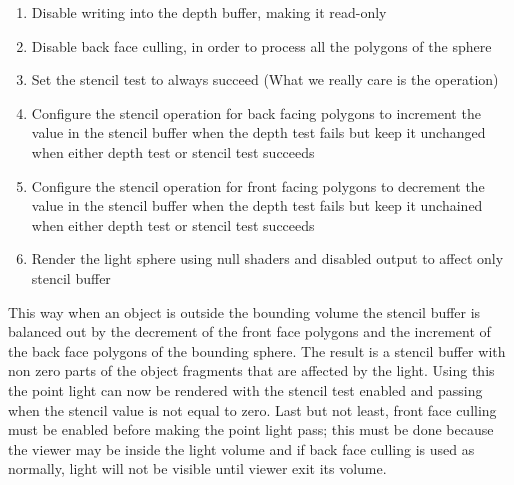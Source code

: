 \begin{enumerate}
    \item Disable writing into the depth buffer, making it read-only
    \item Disable back face culling, in order to process all the polygons of the sphere
    \item Set the stencil test to always succeed (What we really care is the operation)
    \item Configure the stencil operation for back facing polygons to increment the value in the stencil buffer
        when the depth test fails but keep it unchanged when either depth test or stencil test succeeds
    \item Configure the stencil operation for front facing polygons to decrement the value in the stencil buffer
        when the depth test fails but keep it unchained when either depth test or stencil test succeeds
    \item Render the light sphere using null shaders and disabled output to affect only stencil buffer
\end{enumerate}
This way when an object is outside the bounding volume the stencil buffer is balanced out by the decrement of the
front face polygons and the increment of the back face polygons of the bounding sphere. The result is a stencil buffer
with non zero parts of the object fragments that are affected by the light. Using this the point light can now be rendered
with the stencil test enabled and passing when the stencil value is not equal to zero. Last but not least,
front face culling must be enabled before making the point light pass; this must be done because the viewer may be inside
the light volume and if back face culling is used as normally, light will not be visible until viewer exit its volume.
